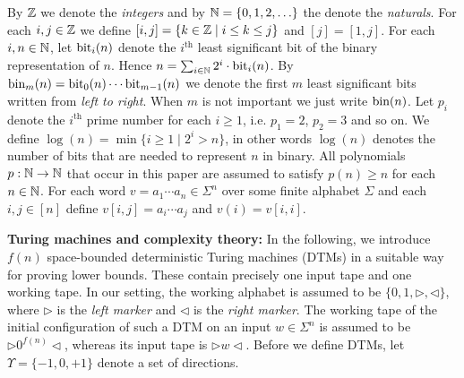 \documentclass[times,envcountsame]{llncs}
\begin{document}
By $\mathbb{Z}$ we denote the {\em integers} and by $\mathbb{N}=\{0,1,2,\ldots\}$ the
denote the {\em naturals}.  For each $i,j\in\mathbb{Z}$ we define
$[i,j]=\{k\in\mathbb{Z}\mid i\leq k\leq j\}$ and $[j]=[1,j]$.  For each
$i,n\in\mathbb{N}$, let $\text{bit}_i(n)$ denote the $i^{\text{th}}$ least
significant bit of the binary representation of $n$. Hence
$n=\sum_{i\in\mathbb{N}}2^i\cdot\text{bit}_i(n)$.  By $\text{bin}_m(n)=\text{bit}_0(n)\cdots
\text{bit}_{m-1}(n)$ we denote the first $m$ least significant bits written
from {\em left to right}. When $m$ is not important we just write
$\text{bin}(n)$.
Let $p_i$ denote the $i^{\text{th}}$ prime number for each $i\geq 1$, i.e. $p_1=2$,
$p_2=3$ and so on. We define $\log(n)=\min\{i\geq 1\mid 2^i> n\}$, in other
words $\log(n)$ denotes the number of bits that are needed to represent $n$ in
binary.
All polynomials $p:\mathbb{N}\rightarrow\mathbb{N}$ that occur in this paper are assumed to satisfy
$p(n)\geq n$ for each $n\in\mathbb{N}$.
For each word $v=a_1\cdots a_n\in\Sigma^n$ over some finite alphabet $\Sigma$
and each $i,j\in[n]$ define $v[i,j]=a_i\cdots a_j$ and
$v(i)=v[i,i]$.

\bigskip

\renewcommand{\l}{\triangleright}
\renewcommand{\r}{\triangleleft}
\newcommand{\move}{\vdash}
\noindent
{\bf Turing machines and complexity theory:} In the following, we
introduce $f(n)$ space-bounded deterministic Turing machines (DTMs) in
a suitable way for proving lower bounds. These contain precisely one
input tape and one working tape.  In our setting, the working alphabet is
 assumed to be $\{0,1,\l,\r\}$,
where $\l$ is the {\em left marker}
and $\r$ is the {\em right marker}.  The working tape of the initial
configuration of such a DTM on an input $w\in\Sigma^n$ is
assumed to be $\l0^{f(n)}\r$, whereas its input tape is $\l w\r$.
Before we define DTMs, let $\Upsilon=\{-1,0,+1\}$ denote a set of
directions.
\end{document}
